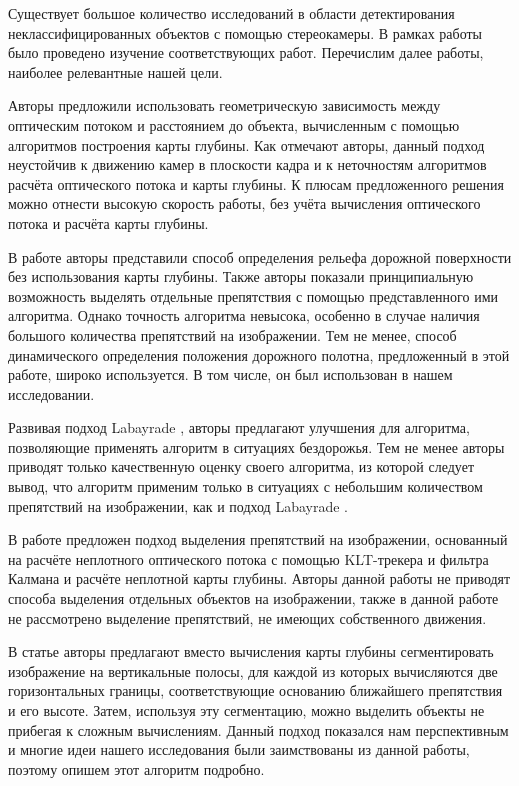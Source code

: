\documentclass[aps,%
14pt,%
final,%
oneside,
onecolumn,%
musixtex, %
superscriptaddress,%
centertags]{extarticle} %
\begin{document}
Существует большое количество исследований в области детектирования неклассифицированных объектов с помощью стереокамеры. В рамках работы было проведено изучение соответствующих работ. Перечислим далее работы, наиболее  релевантные нашей цели.

Авторы \cite{heinrich2002fast} предложили использовать геометрическую зависимость между оптическим потоком и расстоянием до объекта, вычисленным с помощью алгоритмов построения карты глубины. Как отмечают авторы, данный подход неустойчив к движению камер в плоскости кадра и к неточностям алгоритмов расчёта оптического потока и карты глубины. К плюсам предложенного решения можно отнести высокую скорость работы, без учёта вычисления оптического потока и расчёта карты глубины.

В работе \cite{labayrade2002real} авторы представили способ определения рельефа дорожной поверхности без использования карты глубины. Также авторы показали принципиальную возможность выделять отдельные препятствия с помощью представленного ими алгоритма. Однако точность алгоритма невысока, особенно в случае наличия большого количества препятствий на изображении. Тем не менее, способ динамического определения положения дорожного полотна, предложенный в этой работе, широко используется. В том числе, он был использован в нашем исследовании.

Развивая подход Labayrade \cite{labayrade2002real}, авторы \cite{broggi2006single} предлагают улучшения для алгоритма, позволяющие применять алгоритм в ситуациях бездорожья. Тем не менее авторы приводят только качественную оценку своего алгоритма, из которой следует вывод, что алгоритм применим только в ситуациях с небольшим количеством препятствий на изображении, как и подход Labayrade  \cite{labayrade2002real}.

В работе \cite{franke20056d} предложен подход выделения препятствий на изображении, основанный на расчёте неплотного оптического потока с помощью KLT-трекера и фильтра Калмана и расчёте неплотной карты глубины. Авторы данной работы не приводят способа выделения отдельных объектов на изображении, также в данной работе не рассмотрено выделение препятствий, не имеющих собственного движения.

В статье \cite{pfeiffer2010efficient} авторы предлагают вместо вычисления карты глубины сегментировать изображение на вертикальные полосы, для каждой из которых вычисляются две горизонтальных границы, соответствующие основанию ближайшего препятствия и его высоте. Затем, используя эту сегментацию, можно выделить объекты не прибегая к сложным вычислениям. Данный подход показался нам перспективным и многие идеи нашего исследования были заимствованы из данной работы, поэтому опишем этот алгоритм подробно.
\end{document}
